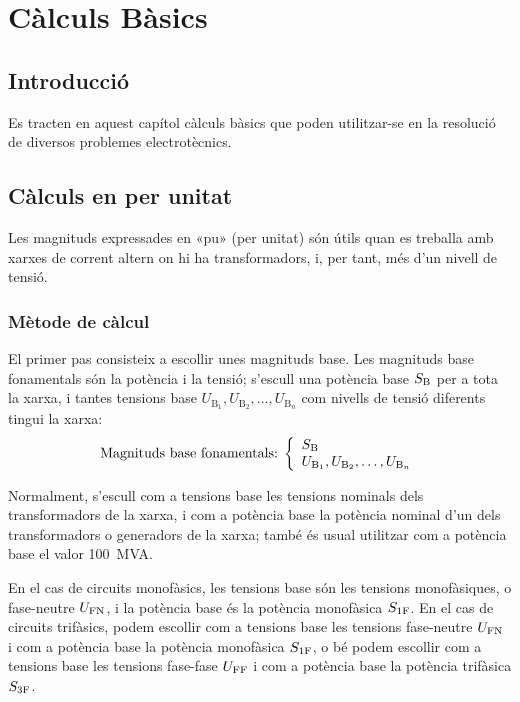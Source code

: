 
\chapter{Càlculs Bàsics}\label{sec:ch-calc-bas}

\section{Introducció}
Es tracten en aquest capítol càlculs bàsics que poden utilitzar-se en la
resolució de diversos problemes electrotècnics.



\section{Càlculs en per unitat} \label{sec:seccio_pu} 

Les magnituds expressades en «pu» (per unitat) són útils quan es treballa
amb xarxes de corrent altern on hi ha transformadors, i, per tant, més d'un nivell de tensió.

\subsection{Mètode de càlcul} 

 El primer pas consisteix a
escollir unes magnituds base. Les magnituds base fonamentals són la
potència i la tensió; s'escull una potència base $S_\mathrm{B}$ per a
tota la xarxa, i tantes tensions base $U_{\text{B}_1}, U_{\text{B}_2}, \ldots,
U_{\text{B}_n}$ com nivells de tensió
diferents tingui la xarxa:
\begin{equation}
   \text{Magnituds base fonamentals:}\;\left\{
\begin{array}{l}
   S_\mathrm{B} \\
   U_{\text{B}_1}, U_{\text{B}_2}, \ldots, U_{\text{B}_n}
\end{array}
\right.
\end{equation}

Normalment, s'escull com a tensions base les tensions nominals dels transformadors de la
xarxa, i com a potència base la potència nominal d'un dels transformadors o generadors de la xarxa; també és usual utilitzar com a potència base el valor \qty{100}{MVA}.

En el cas de circuits monofàsics, les tensions base són les tensions monofàsiques, o fase-neutre $U_\mathrm{FN}$, i la potència base és la potència monofàsica $S_\mathrm{1F}$. En el cas de circuits trifàsics, podem escollir com a tensions base les tensions fase-neutre $U_\mathrm{FN}$ i com a potència base la potència  monofàsica $S_\mathrm{1F}$, o bé podem escollir com a tensions base les tensions fase-fase $U_\mathrm{FF}$ i com a potència base la potència trifàsica $S_\mathrm{3F}$.

